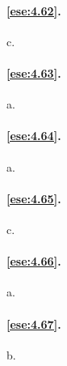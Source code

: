 \paragraph{\ref{ese:4.62}.}
c.

\paragraph{\ref{ese:4.63}.}
a.

\paragraph{\ref{ese:4.64}.}
a.

\paragraph{\ref{ese:4.65}.}
c.

\paragraph{\ref{ese:4.66}.}
a.

\paragraph{\ref{ese:4.67}.}
b.

\endgroup
